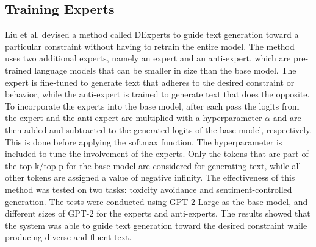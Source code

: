 \subsection{Training Experts}
Liu et al. devised a method called DExperts \cite{liu_dexperts_2021} to guide text generation toward a particular constraint without having to retrain the entire model. The method uses two additional experts, namely an expert and an anti-expert, which are pre-trained language models that can be smaller in size than the base model. The expert is fine-tuned to generate text that adheres to the desired constraint or behavior, while the anti-expert is trained to generate text that does the opposite. To incorporate the experts into the base model, after each pass the logits from the expert and the anti-expert are multiplied with a hyperparameter \(\alpha\) and are then added and subtracted to the generated logits of the base model, respectively. This is done before applying the softmax function. The hyperparameter is included to tune the involvement of the experts. Only the tokens that are part of the top-k/top-p for the base model are considered for generating text, while all other tokens are assigned a value of negative infinity. The effectiveness of this method was tested on two tasks: toxicity avoidance and sentiment-controlled generation. The tests were conducted using GPT-2 Large as the base model, and different sizes of GPT-2 for the experts and anti-experts. The results showed that the system was able to guide text generation toward the desired constraint while producing diverse and fluent text.

